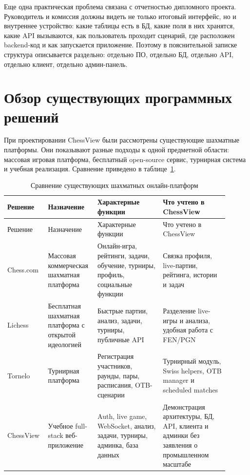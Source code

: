 Еще одна практическая проблема связана с отчетностью дипломного проекта. Руководитель и комиссия должны видеть не только итоговый интерфейс, но и внутреннее устройство: какие таблицы есть в БД, какие поля в них хранятся, какие API вызываются, как пользователь проходит сценарий, где расположен backend-код и как запускается приложение. Поэтому в пояснительной записке структура описывается раздельно: отдельно ПО, отдельно БД, отдельно API, отдельно клиент, отдельно админ-панель.

\section{Обзор существующих программных решений}

При проектировании ChessView были рассмотрены существующие шахматные платформы. Они показывают разные подходы к одной предметной области: массовая игровая платформа, бесплатный open-source сервис, турнирная система и учебная реализация. Сравнение приведено в таблице~\ref{tab:analogues}.

\noindent\scriptsize
\setlength{\tabcolsep}{3pt}
\renewcommand{\arraystretch}{1.18}
\begin{longtable}{|>{\RaggedRight\arraybackslash}p{0.14\linewidth}|>{\RaggedRight\arraybackslash}p{0.20\linewidth}|>{\RaggedRight\arraybackslash}p{0.28\linewidth}|>{\RaggedRight\arraybackslash}p{0.28\linewidth}|}
\caption{Сравнение существующих шахматных онлайн-платформ}\label{tab:analogues}\\
\hline
Решение & Назначение & Характерные функции & Что учтено в ChessView\\ \hline
\endfirsthead
\hline
Решение & Назначение & Характерные функции & Что учтено в ChessView\\ \hline
\endhead
Chess.com & Массовая коммерческая шахматная платформа & Онлайн-игра, рейтинги, задачи, обучение, турниры, профиль, социальные функции & Связка профиля, live-партии, рейтинга, истории и задач\\ \hline
Lichess & Бесплатная шахматная платформа с открытой идеологией & Быстрые партии, анализ, задачи, турниры, публичные API & Разделение live-игры и анализа, удобная работа с FEN/PGN\\ \hline
Tornelo & Турнирная платформа & Регистрация участников, раунды, пары, расписания, OTB-сценарии & Турнирный модуль, Swiss helpers, OTB manager и scheduled matches\\ \hline
ChessView & Учебное full-stack веб-приложение & Auth, live game, WebSocket, анализ, задачи, турниры, админка, база данных & Демонстрация архитектуры, БД, API, клиента и админки без заявления о промышленном масштабе\\ \hline
\end{longtable}
\normalsize

